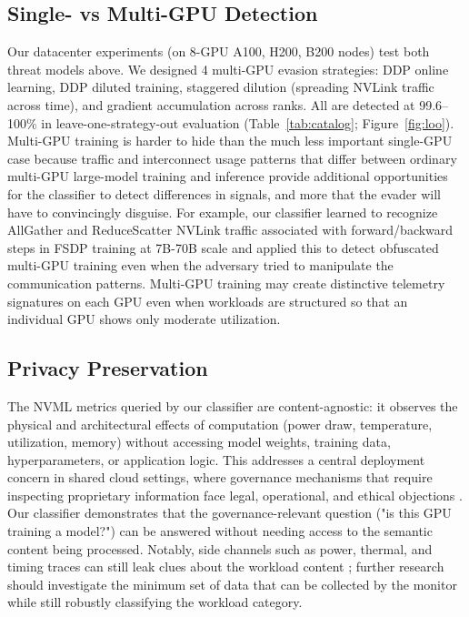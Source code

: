 \subsection{Single- vs Multi-GPU Detection}

Our datacenter experiments (on 8-GPU A100, H200, B200 nodes) test both threat models above. We designed 4 multi-GPU evasion strategies: DDP online learning, DDP diluted training, staggered dilution (spreading NVLink traffic across time), and gradient accumulation across ranks. All are detected at 99.6--100\% in leave-one-strategy-out evaluation (Table~\ref{tab:catalog}; Figure~\ref{fig:loo}). Multi-GPU training is harder to hide than the much less important single-GPU case because traffic and interconnect usage patterns that differ between ordinary multi-GPU large-model training and inference provide additional opportunities for the classifier to detect differences in signals, and more that the evader will have to convincingly disguise. For example, our classifier learned to recognize AllGather and ReduceScatter NVLink traffic associated with forward/backward steps in FSDP training at 7B-70B scale and applied this to detect obfuscated multi-GPU training even when the adversary tried to manipulate the communication patterns. Multi-GPU training may create distinctive telemetry signatures on each GPU even when workloads are structured so that an individual GPU shows only moderate utilization.

\subsection{Privacy Preservation}
\label{sec:privacy}

The NVML metrics queried by our classifier are content-agnostic: it observes the physical and architectural effects of computation (power draw, temperature, utilization, memory) without accessing model weights, training data, hyperparameters, or application logic. This addresses a central deployment concern in shared cloud settings, where governance mechanisms that require inspecting proprietary information face legal, operational, and ethical objections \citep{shavit2023,ogara2025}. Our classifier demonstrates that the governance-relevant question ("is this GPU training a model?") can be answered without needing access to the semantic content being processed. Notably, side channels such as power, thermal, and timing traces can still leak clues about the workload content \citep{tang2022,chaudhuri2025}; further research should investigate the minimum set of data that can be collected by the monitor while still robustly classifying the workload category.

